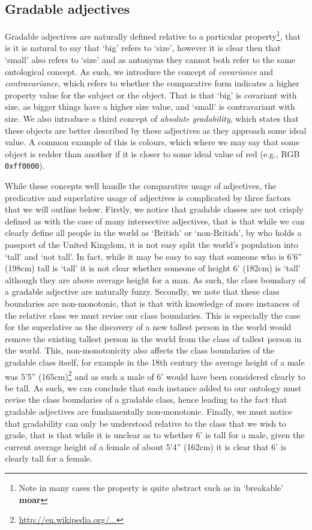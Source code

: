 \documentclass[11pt]{article}
\begin{document}
\subsection{Gradable adjectives}

Gradable adjectives are naturally defined relative to a particular 
property\footnote{Note in many cases the property is quite abstract such as in 
`breakable' \textbf{moar}}, that is it is natural to say that `big' refers to 
`size', however it is clear then that `small' also refers to `size' and as antonyms 
they cannot both refer to the same ontological concept. As such, we introduce 
the concept of \emph{covariance} and \emph{contravariance}, which refers to 
whether the comparative form indicates a higher property value for the subject 
or the object. That is that `big' is covariant with size, as bigger things have 
a higher size value, and `small' is contravariant with size. We also introduce 
a third concept of \emph{absolute gradability}, which states that these objects 
are better described by these adjectives as they approach some ideal value. 
A common example of this is colours, which where we may say that some object is 
redder than another if it is closer to some ideal value of red 
(e.g., RGB {\tt 0xff0000}). 

While these concepts well handle the comparative usage of adjectives, the 
predicative and superlative usage of adjectives is complicated by three factors 
that we will outline below. Firstly, we notice that gradable classes are not 
crisply defined as with the case of many intersective adjectives, that is that 
while we can clearly define all people in the world as `British' or 
`non-British', by who holds a passport of the United Kingdom, it is not easy 
split the world's population into `tall' and `not tall'. In fact, while it may 
be easy to say that someone who is 6'6'' (198cm) tall is `tall' it is not clear 
whether someone of height 6' (182cm) is `tall' although they are above average 
height for a man. As such, the class boundary of a gradable adjective are 
naturally fuzzy. Secondly, we note that these class boundaries are 
non-monotonic, that is that with knowledge of more instances of the relative 
class we must revise our class boundaries. This is especially the case for the
superlative as the discovery of a new tallest person in the world would remove 
the existing tallest person in the world from the class of tallest person in the 
world. This, non-monotonicity also affects the class boundaries of the gradable 
class itself, for example in the 18th century the average height of a male was 
5'5'' (165cm)\footnote{\url{http://en.wikipedia.org/...}}
and as such a male of 6' would have been considered clearly to be 
tall. As such, we can conclude that each instance added to our ontology must 
revise the class boundaries of a gradable class, hence leading to the fact that 
gradable adjectives are fundamentally non-monotonic. Finally, we must notice 
that gradability can only be understood relative to the class that we wish to 
grade, that is that while it is unclear as to whether 6' is tall for a male, 
given the current average height of a female of about 5'4'' (162cm) it is clear 
that 6' is clearly tall for a female.
\end{document}
